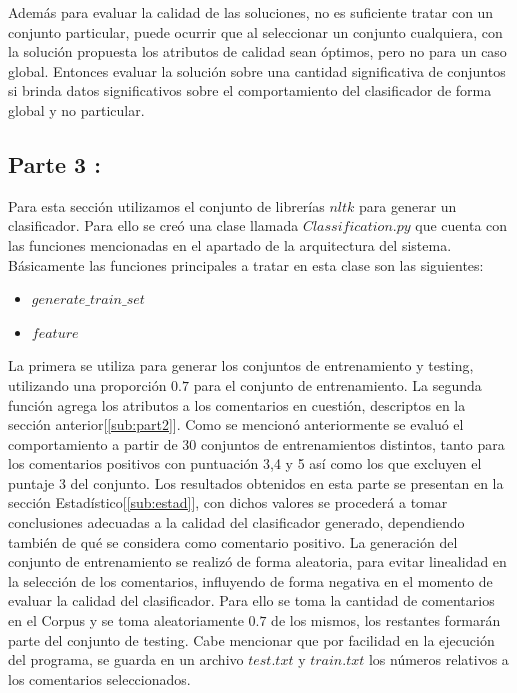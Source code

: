 \documentclass[12pt]{article}
\begin{document}
Además para evaluar la calidad de las soluciones, no es suficiente tratar con un conjunto particular, puede ocurrir que al seleccionar un conjunto cualquiera, con la solución propuesta los atributos de calidad sean óptimos, pero no para un caso global. Entonces evaluar la solución sobre una cantidad significativa de conjuntos si brinda datos significativos sobre el comportamiento del clasificador de forma global y no particular.


\subsection{Parte 3 :}
Para esta sección utilizamos el conjunto de librerías $nltk$ para generar un clasificador. Para ello se creó una clase llamada $Classification.py$ que cuenta con las funciones mencionadas en el apartado de la arquitectura del sistema. Básicamente las funciones principales a tratar en esta clase son las siguientes:
\begin{itemize}
  \item $generate\_train\_set$
  \item $feature$
\end{itemize}
La primera se utiliza para generar los conjuntos de entrenamiento y testing, utilizando una proporción $0.7$ para el conjunto de entrenamiento.
La segunda función agrega los atributos a los comentarios en cuestión, descriptos en la sección anterior[\ref{sub:part2}].
Como se mencionó anteriormente se evaluó el comportamiento a partir de 30 conjuntos de entrenamientos distintos, tanto para los comentarios positivos con puntuación 3,4 y 5 así como los que excluyen el puntaje 3 del conjunto.
Los resultados obtenidos en esta parte se presentan en la sección Estadístico[\ref{sub:estad}], con dichos valores se procederá a tomar conclusiones adecuadas a la calidad del clasificador generado, dependiendo también de qué se considera como comentario positivo.
La generación del conjunto de entrenamiento se realizó de forma aleatoria, para evitar linealidad en la selección de los comentarios, influyendo de forma negativa en el momento de evaluar la calidad del clasificador. Para ello se toma la cantidad de comentarios en el Corpus y se toma aleatoriamente $0.7$ de los mismos, los restantes formarán parte del conjunto de testing. Cabe mencionar que por facilidad en la ejecución del programa, se guarda en un archivo $test.txt$ y $train.txt$ los números relativos a los comentarios seleccionados.

\end{document}
